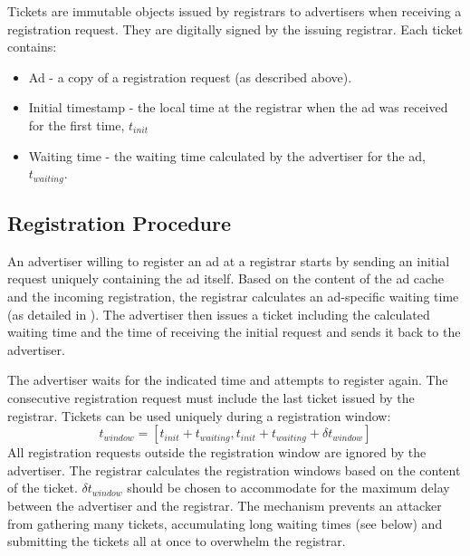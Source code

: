 Tickets are immutable objects issued by registrars to advertisers when receiving a registration request. 
They are digitally signed by the issuing registrar.
Each ticket contains:
\begin{itemize}
    \item Ad - a copy of a registration request (as described above). 
    \item Initial timestamp - the local time at the registrar when the ad was received for the first time, $t_\textit{init}$
    \item Waiting time - the waiting time calculated by the advertiser for the ad, $t_\textit{waiting}$.
\end{itemize}


\subsection{Registration Procedure}
An advertiser willing to register an ad at a registrar starts by sending an
initial request uniquely containing the ad itself. Based on the
content of the ad cache and the incoming registration, the registrar calculates an
ad-specific waiting time (as detailed in ). 
The advertiser then issues a ticket including the calculated waiting time and the time of receiving the initial request and sends it back to the advertiser.

The advertiser waits for the indicated time and attempts to register again. The consecutive registration request must include the last ticket issued by the registrar. Tickets can be used uniquely during a registration window:
\begin{equation}\label{eq:registration_window}
    t_\textit{window} = [t_\textit{init} + t_\textit{waiting}, t_\textit{init} + t_\textit{waiting} + \delta t_\textit{window}]
\end{equation}
All registration requests outside the registration window are ignored by the advertiser. The registrar calculates the registration windows based on the content of the ticket. $\delta t_\textit{window}$ should be chosen to accommodate for the maximum delay between the advertiser and the registrar. The mechanism prevents an attacker from gathering many tickets, accumulating long waiting times (see below) and submitting the tickets all at once to overwhelm the registrar. 

